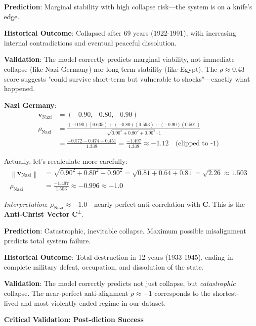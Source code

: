 \documentclass[11pt,a4paper]{article}
\theoremstyle{definition}
\theoremstyle{remark}
\newcommand{\norm}[1]{\left\|#1\right\|}
\begin{document}
\begin{small}
\textbf{Prediction}: Marginal stability with high collapse risk—the system is on a knife's edge.

\textbf{Historical Outcome}: Collapsed after 69 years (1922-1991), with increasing internal contradictions and eventual peaceful dissolution.

\textbf{Validation}: The model correctly predicts marginal viability, not immediate collapse (like Nazi Germany) nor long-term stability (like Egypt). The \(\rho \approx 0.43\) score suggests "could survive short-term but vulnerable to shocks"—exactly what happened.

\textbf{Nazi Germany}:
\begin{align}
\mathbf{v}_{\text{Nazi}} &= (-0.90, -0.80, -0.90) \\
\rho_{\text{Nazi}} &= \frac{(-0.90)(0.635) + (-0.80)(0.593) + (-0.90)(0.501)}{\sqrt{0.90^2 + 0.80^2 + 0.90^2} \cdot 1} \\
&= \frac{-0.572 - 0.474 - 0.451}{1.338} = \frac{-1.497}{1.338} \approx -1.12 \quad \text{(clipped to -1)}
\end{align}

Actually, let's recalculate more carefully:
\begin{align}
\norm{\mathbf{v}_{\text{Nazi}}} &= \sqrt{0.90^2 + 0.80^2 + 0.90^2} = \sqrt{0.81 + 0.64 + 0.81} = \sqrt{2.26} \approx 1.503 \\
\rho_{\text{Nazi}} &= \frac{-1.497}{1.503} \approx -0.996 \approx -1.0
\end{align}

\textit{Interpretation}: \(\rho_{\text{Nazi}} \approx -1.0\)—nearly perfect anti-correlation with \(\mathbf{C}\). This is the \textbf{Anti-Christ Vector} \(\mathbf{C}^{\perp}\).

\textbf{Prediction}: Catastrophic, inevitable collapse. Maximum possible misalignment predicts total system failure.

\textbf{Historical Outcome}: Total destruction in 12 years (1933-1945), ending in complete military defeat, occupation, and dissolution of the state.

\textbf{Validation}: The model correctly predicts not just collapse, but \textit{catastrophic} collapse. The near-perfect anti-alignment \(\rho \approx -1\) corresponds to the shortest-lived and most violently-ended regime in our dataset.

\begin{mdframed}[backgroundcolor=yellow!10,linewidth=2pt]
\textbf{Critical Validation: Post-diction Success}


\end{mdframed}
\end{small}
\end{document}
